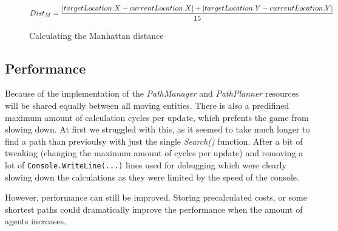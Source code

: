 \begin{figure}[h!]
    \[ $$Dist_M = \dfrac{|targetLocation.X - currentLocation.X| + |targetLocation.Y - currentLocation.Y|}{15}\]
    \caption{Calculating the Manhattan distance}
    \label{fig:pathPlanCalcManhattan}
\end{figure}

\subsection{Performance}\label{subsec:pathperformance}
Because of the implementation of the \textit{PathManager} and \textit{PathPlanner} resources will be shared equally between all moving entities.
There is also a predifined maximum amount of calculation cycles per update, which prefents the game from slowing down.
At first we struggled with this, as it seemed to take much longer to find a path than previoulsy with just the single \textit{Search()} function.
After a bit of tweaking (changing the maximum amount of cycles per update) and removing a lot of \lstinline[columns=fixed]{Console.WriteLine(...)}
lines used for debugging which were clearly slowing down the calculations as they were limited by the speed of the console.\par
However, performance can still be improved.
Storing precalculated costs, or some shortest paths could dramatically improve the performance when the amount of agents increases.